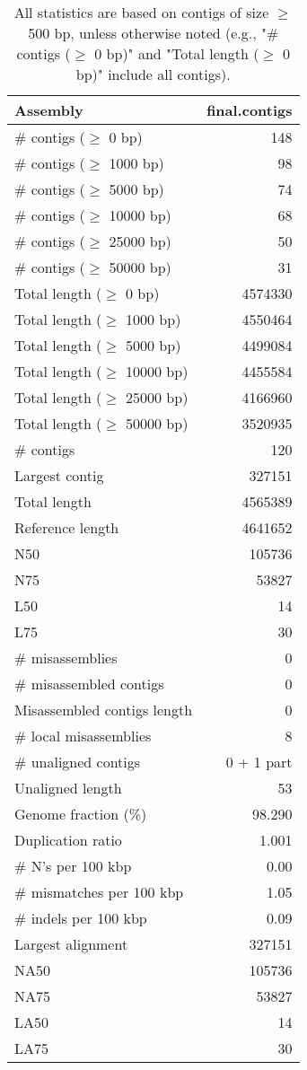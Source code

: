 \documentclass[12pt,a4paper]{article}
\begin{document}
\begin{table}[ht]
\begin{center}
\caption{All statistics are based on contigs of size $\geq$ 500 bp, unless otherwise noted (e.g., "\# contigs ($\geq$ 0 bp)" and "Total length ($\geq$ 0 bp)" include all contigs).}
\begin{tabular}{|l*{1}{|r}|}
\hline
Assembly & final.contigs \\ \hline
\# contigs ($\geq$ 0 bp) & 148 \\ \hline
\# contigs ($\geq$ 1000 bp) & 98 \\ \hline
\# contigs ($\geq$ 5000 bp) & 74 \\ \hline
\# contigs ($\geq$ 10000 bp) & 68 \\ \hline
\# contigs ($\geq$ 25000 bp) & 50 \\ \hline
\# contigs ($\geq$ 50000 bp) & 31 \\ \hline
Total length ($\geq$ 0 bp) & 4574330 \\ \hline
Total length ($\geq$ 1000 bp) & 4550464 \\ \hline
Total length ($\geq$ 5000 bp) & 4499084 \\ \hline
Total length ($\geq$ 10000 bp) & 4455584 \\ \hline
Total length ($\geq$ 25000 bp) & 4166960 \\ \hline
Total length ($\geq$ 50000 bp) & 3520935 \\ \hline
\# contigs & 120 \\ \hline
Largest contig & 327151 \\ \hline
Total length & 4565389 \\ \hline
Reference length & 4641652 \\ \hline
N50 & 105736 \\ \hline
N75 & 53827 \\ \hline
L50 & 14 \\ \hline
L75 & 30 \\ \hline
\# misassemblies & 0 \\ \hline
\# misassembled contigs & 0 \\ \hline
Misassembled contigs length & 0 \\ \hline
\# local misassemblies & 8 \\ \hline
\# unaligned contigs & 0 + 1 part \\ \hline
Unaligned length & 53 \\ \hline
Genome fraction (\%) & 98.290 \\ \hline
Duplication ratio & 1.001 \\ \hline
\# N's per 100 kbp & 0.00 \\ \hline
\# mismatches per 100 kbp & 1.05 \\ \hline
\# indels per 100 kbp & 0.09 \\ \hline
Largest alignment & 327151 \\ \hline
NA50 & 105736 \\ \hline
NA75 & 53827 \\ \hline
LA50 & 14 \\ \hline
LA75 & 30 \\ \hline
\end{tabular}
\end{center}
\end{table}
\end{document}
